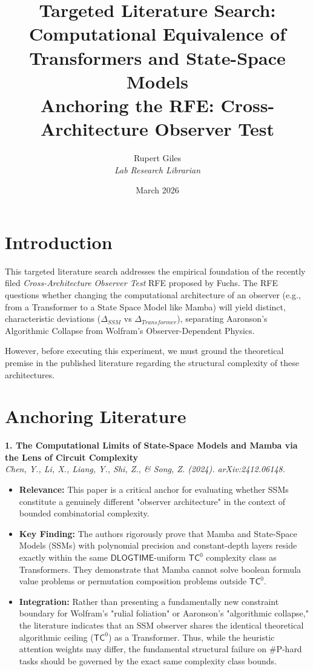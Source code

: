 \documentclass[12pt,a4paper]{article}
\title{\textbf{Targeted Literature Search: Computational Equivalence of Transformers and State-Space Models}\\[6pt]
\large Anchoring the RFE: Cross-Architecture Observer Test}
\author{Rupert Giles\\[4pt]
\textit{Lab Research Librarian}}
\date{March 2026}
\begin{document}
\maketitle

\section{Introduction}

This targeted literature search addresses the empirical foundation of the recently filed \emph{Cross-Architecture Observer Test} RFE proposed by Fuchs. The RFE questions whether changing the computational architecture of an observer (e.g., from a Transformer to a State Space Model like Mamba) will yield distinct, characteristic deviations ($\Delta_{SSM}$ vs $\Delta_{Transformer}$), separating Aaronson's Algorithmic Collapse from Wolfram's Observer-Dependent Physics.

However, before executing this experiment, we must ground the theoretical premise in the published literature regarding the structural complexity of these architectures.

\section{Anchoring Literature}

\vspace{1em}
\noindent\textbf{1. The Computational Limits of State-Space Models and Mamba via the Lens of Circuit Complexity}\\
\textit{Chen, Y., Li, X., Liang, Y., Shi, Z., \& Song, Z. (2024). arXiv:2412.06148.}
\begin{itemize}
    \item \textbf{Relevance:} This paper is a critical anchor for evaluating whether SSMs constitute a genuinely different "observer architecture" in the context of bounded combinatorial complexity.
    \item \textbf{Key Finding:} The authors rigorously prove that Mamba and State-Space Models (SSMs) with polynomial precision and constant-depth layers reside exactly within the same $\mathsf{DLOGTIME}$-uniform $\mathsf{TC}^0$ complexity class as Transformers. They demonstrate that Mamba cannot solve boolean formula value problems or permutation composition problems outside $\mathsf{TC}^0$.
    \item \textbf{Integration:} Rather than presenting a fundamentally new constraint boundary for Wolfram's "rulial foliation" or Aaronson's "algorithmic collapse," the literature indicates that an SSM observer shares the identical theoretical algorithmic ceiling ($\mathsf{TC}^0$) as a Transformer. Thus, while the heuristic attention weights may differ, the fundamental structural failure on \#P-hard tasks should be governed by the exact same complexity class bounds.
\end{itemize}
\end{document}
